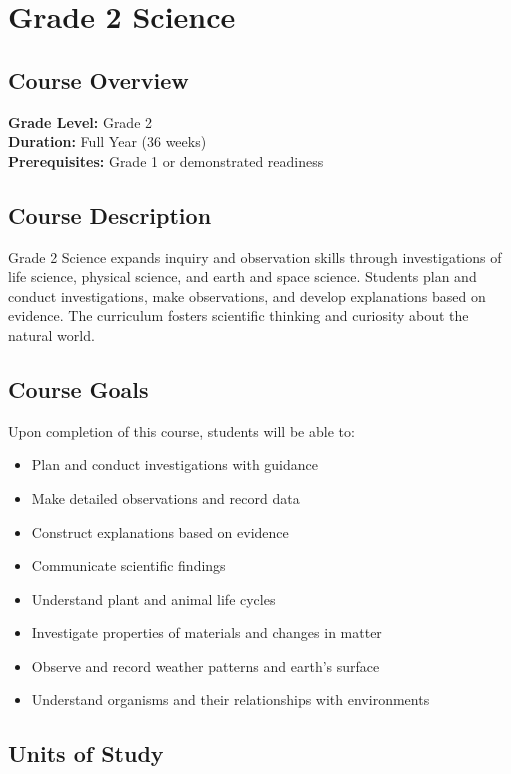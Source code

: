 \documentclass[11pt,letterpaper]{report}
\begin{document}
\chapter{Grade 2 Science}

\section{Course Overview}

\textbf{Grade Level:} Grade 2\\
\textbf{Duration:} Full Year (36 weeks)\\
\textbf{Prerequisites:} Grade 1 or demonstrated readiness

\section{Course Description}

Grade 2 Science expands inquiry and observation skills through investigations of life science, physical science, and earth and space science. Students plan and conduct investigations, make observations, and develop explanations based on evidence. The curriculum fosters scientific thinking and curiosity about the natural world.

\section{Course Goals}

Upon completion of this course, students will be able to:

\begin{itemize}
    \item Plan and conduct investigations with guidance
    \item Make detailed observations and record data
    \item Construct explanations based on evidence
    \item Communicate scientific findings
    \item Understand plant and animal life cycles
    \item Investigate properties of materials and changes in matter
    \item Observe and record weather patterns and earth's surface
    \item Understand organisms and their relationships with environments
\end{itemize}

\section{Units of Study}
\end{document}
